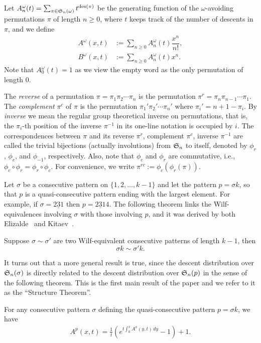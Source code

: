Let $A_n^{\omega}(t)=\sum_{\pi \in \S_n(\omega)} t^{\des(\pi)}$ be the generating function of the $\omega$-avoiding permutations $\pi$ of length $n\geq 0$, where $t$ keeps track of the number of descents in $\pi$, and we define
\begin{align*}
A^{\omega}(x,t) &:= \sum_{n\ge 0} A_n^{\omega}(t)\dfrac{x^n}{n!},\\
B^{\omega}(x,t) &:= \sum_{n\ge 0} A_n^{\omega}(t) x^n.
\end{align*} 
Note that $A_0^{\omega}(t)=1$ as we view the empty word as the only permutation of length $0$.

The \textit{reverse} of a permutation $\pi=\pi_1\pi_2\cdots \pi_n$ is the permutation $\pi^{r}=\pi_n\pi_{n-1}\cdots\pi_1$.
The \textit{complement} $\pi^{c}$ of $\pi$ is the permutation $\pi_1'\pi_2'\cdots\pi_n'$ where $\pi_i'=n+1-\pi_i$. By \textit{inverse} we mean the regular group theoretical inverse on permutations, that is, the $\pi_{i}$-th position of the inverse $\pi^{-1}$ in its one-line notation is occupied by $i$. The correspondences between $\pi$ and its reverse $\pi^r$, complement $\pi^c$, inverse $\pi^{-1}$ are called the trivial bijections (actually involutions) from $\S_n$ to itself,
denoted by $\phi _r$, $\phi_c$, and $\phi_{-1}$, respectively.
Also, note that $\phi_c$ and $\phi_r$ are commutative, i.e., $\phi_c\circ\phi_r=\phi_r\circ\phi_c $.
For convenience, we write $\pi^{rc}:=\phi_c(\phi_r(\pi))$.

Let $\sigma$ be a consecutive pattern on $\{1,2,\ldots,k-1\}$ and let the pattern $p=\sigma k$,
so that $p$ is a quasi-consecutive pattern ending with the largest element. For example, if $\sigma=\underline{231} $ then $p=\underline{231}4$. The following theorem links the Wilf-equivalences involving $\sigma$ with those involving $p$, and it was derived by both Elizalde~\cite{eli06} and Kitaev~\cite{kit05}. 
\begin{theorem}\label{thm:eli-kit}
Suppose $\sigma\sim\sigma'$ are two Wilf-equivalent consecutive patterns of length $k-1$, then
$$\sigma k\sim\sigma'k.$$
\end{theorem}

It turns out that a more general result is true, since the descent distribution over $\S_n(\sigma)$ is directly related to the descent distribution over $\S_n(p)$ in the sense of the following theorem. This is the first main result of the paper and we refer to it as the ``Structure Theorem''.

\begin{theorem}\label{structure thm}
    For any consecutive pattern $\sigma$ defining the quasi-consecutive pattern $p=\sigma k$, we have 
    \begin{align}
    \label{id:struc}
    A^p(x,t) = \frac{1}{t} (e^{t \int_{0}^{x} A^{\sigma}(y,t) \,dy}-1) +1.
    \end{align}
\end{theorem}


